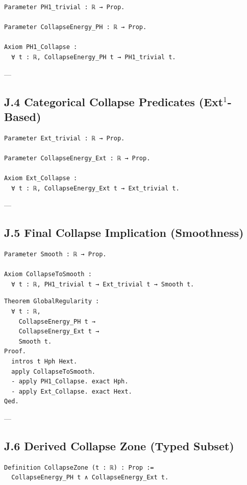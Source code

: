 \documentclass[11pt]{article}
\begin{document}
{{\begin{lstlisting}[language=Coq]
Parameter PH1_trivial : ℝ → Prop.

Parameter CollapseEnergy_PH : ℝ → Prop.

Axiom PH1_Collapse :
  ∀ t : ℝ, CollapseEnergy_PH t → PH1_trivial t.
\end{lstlisting}

---

\subsection*{J.4 Categorical Collapse Predicates (Ext$^1$-Based)}

\begin{lstlisting}[language=Coq]
Parameter Ext_trivial : ℝ → Prop.

Parameter CollapseEnergy_Ext : ℝ → Prop.

Axiom Ext_Collapse :
  ∀ t : ℝ, CollapseEnergy_Ext t → Ext_trivial t.
\end{lstlisting}

---

\subsection*{J.5 Final Collapse Implication (Smoothness)}

\begin{lstlisting}[language=Coq]
Parameter Smooth : ℝ → Prop.

Axiom CollapseToSmooth :
  ∀ t : ℝ, PH1_trivial t → Ext_trivial t → Smooth t.
\end{lstlisting}

\begin{lstlisting}[language=Coq]
Theorem GlobalRegularity :
  ∀ t : ℝ,
    CollapseEnergy_PH t →
    CollapseEnergy_Ext t →
    Smooth t.
Proof.
  intros t Hph Hext.
  apply CollapseToSmooth.
  - apply PH1_Collapse. exact Hph.
  - apply Ext_Collapse. exact Hext.
Qed.
\end{lstlisting}

---

\subsection*{J.6 Derived Collapse Zone (Typed Subset)}

\begin{lstlisting}[language=Coq]
Definition CollapseZone (t : ℝ) : Prop :=
  CollapseEnergy_PH t ∧ CollapseEnergy_Ext t.
\end{lstlisting}

}}
\end{document}
